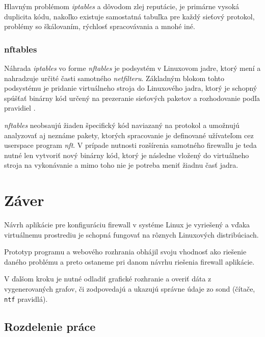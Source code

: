 Hlavným problémom \emph{iptables} a dôvodom zlej reputácie, je primárne vysoká duplicita kódu, nakoľko existuje samostatná tabuľka pre každý sieťový protokol, problémy so škálovaním, rýchlosť spracovávania a mnohé iné.

\subsection{nftables}
\label{nftables}
Náhrada \emph{iptables} vo forme \emph{nftables} je podsystém v Linuxovom jadre, ktorý mení a nahradzuje určité časti samotného \emph{netfilteru}. Základným blokom tohto podsystému je pridanie virtuálneho stroja do Linuxového jadra, ktorý je schopný spúšťať binárny kód určený na prezeranie sieťových paketov a rozhodovanie podľa pravidiel \cite{manpages, netfilter}. 

                                                                                 
\emph{nftables} neobsaujú žiaden špecifický kód naviazaný na protokol a umožnujú analyzovať aj neznáme pakety, ktorých spracovanie je definované užívateľom cez userspace program \emph{nft}. V prípade nutnosti rozšírenia samotného firewallu je teda nutné len vytvoriť nový binárny kód, ktorý je následne vložený do virtuálneho stroja na vykonávanie a mimo toho nie je potreba meniť žiadnu časť jadra.



\chapter{Záver}

	Návrh aplikácie pre konfiguráciu firewall v systéme Linux je vyriešený a vďaka virtuálnemu prostrediu je schopná
	fungovať na rôznych Linuxových distribúciach. 
	
	Prototyp programu a webového rozhrania obhájil svoju vhodnosť ako riešenie daného problému a preto ostaneme pri 
	danom návrhu riešenia firewall aplikácie.
	
	V ďalšom kroku je nutné odladiť grafické rozhranie a overiť dáta z vygenerovaných grafov, či zodpovedajú a ukazujú
	správne údaje zo sond (čítače, \texttt{ntf} pravidlá).

	\section{Rozdelenie práce}
	
